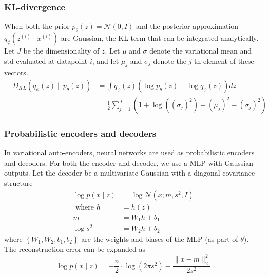 \subsubsection*{KL-divergence}
When both the prior $p_{\theta}(z)=\mathcal{N} (0, I)$ and the posterior approximation $q_{\phi} \left(z^{(i)} \mid x^{(i)}\right)$ are Gaussian, the KL term that can be integrated analytically. Let $J$ be the dimensionality of $z$. Let $\mu$ and $\sigma$ denote the variational mean and std evaluated at datapoint $i$, and let $\mu_{j}$ and $\sigma_{j}$ denote the $j$-th element of these vectors.
\begin{equation*}
\begin{aligned}
-D_{KL}\left(q_{\phi}(z) \| p_{\theta}(z)\right)
&=\int q_{\phi}(z)\left(\log p_{\theta}(z)-\log q_{\phi}(z)\right) dz \\
&=\frac{1}{2} \sum_{j=1}^{J}\left(1+\log \left(\left(\sigma_{j}\right)^{2}\right)-\left(\mu_{j}\right)^{2}-\left(\sigma_{j}\right)^{2}\right)
\end{aligned}
\end{equation*}

\subsubsection*{Probabilistic encoders and decoders}
In variational auto-encoders, neural networks are used as probabilistic encoders and decoders. For both the encoder and decoder, we use a MLP with Gaussian outputs. Let the decoder be a multivariate Gaussian with a diagonal covariance structure
\begin{equation*}
\begin{aligned}
\log p\left(x \mid z\right) &=\log \mathcal{N}\left(x; m, {s^{2}}, I\right) \\
\text{ where } h &= h \left(z\right) \\
m &=W_{1}h+b_{1} \\
\log {s^{2}} &=W_{2}h+b_{2}
\end{aligned}
\end{equation*}
where $\left\{W_{1}, W_{2}, b_{1}, b_{2} \right\}$ are the weights and biases of the MLP (as part of $\theta$). The reconstruction error can be expanded as
\begin{equation*}
\log p\left(x \mid z\right) = -\frac{n}{2} \cdot \log \left(2\pi{s^{2}}\right) - \frac{\lVert x -  m \rVert_{2}^{2}} {2{s^{2}}}
\end{equation*}
